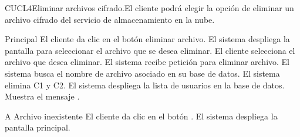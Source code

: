 
\begin{UseCase}{CUCL4}{Eliminar archivos cifrado.}{El cliente podrá elegir la opción de eliminar un archivo cifrado del servicio de almacenamiento en la nube.}

\end{UseCase}


\begin{UCtrayectoria}{Principal}
	\UCpaso [\UCactor] El cliente da clic en el botón eliminar archivo.
	\UCpaso  El sistema despliega la pantalla para seleccionar el archivo que se desea eliminar.
	\UCpaso [\UCactor] El cliente selecciona el archivo que desea eliminar.
	\UCpaso  El sistema recibe petición para eliminar archivo.
	\UCpaso  El sistema busca el nombre de archivo asociado en su base de datos.
	\UCpaso  El sistema elimina C1 y C2.
	\UCpaso  El sistema despliega la lista de usuarios en la base de datos.
	\UCpaso Muestra el mensaje .\end{UCtrayectoria}

\begin{UCtrayectoriaA}{A}
	{Archivo inexistente}
	\UCpaso [\UCactor] El cliente da clic en el botón \IUbuttonAceptar.
	\UCpaso El sistema despliega la pantalla principal.
\end{UCtrayectoriaA}
